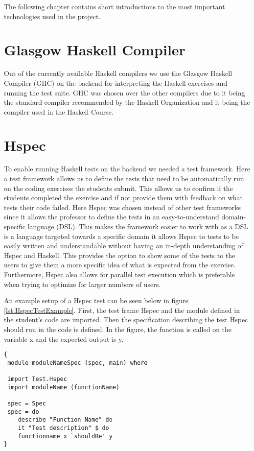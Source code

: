 The following chapter contains short introductions to the most important technologies used in the project. 

\section*{Glasgow Haskell Compiler} %
Out of the currently available Haskell compilers we use the Glasgow Haskell Compiler (GHC) on the backend for interpreting the Haskell exercises and running the test suite. GHC was chosen over the other compilers due to it being the standard compiler recommended by the Haskell Organization \cite{Haskell_GHC} and it being the compiler used in the Haskell Course.

\section*{Hspec}
To enable running Haskell tests on the backend we needed a test framework. Here a test framework allows us to define the tests that need to be automatically run on the coding exercises the students submit. This allows us to confirm if the students completed the exercise and if not provide them with feedback on what tests their code failed.
Here Hspec was chosen instead of other test frameworks since it allows the professor to define the tests in an easy-to-understand domain-specific language (DSL). 
This makes the framework easier to work with as a DSL is a language targeted towards a specific domain it allows Hspec to tests to be easily written and understandable without having an in-depth understanding of Hspec and Haskell. 
This provides the option to show some of the tests to the users to give them a more specific idea of what is expected from the exercise. 
Furthermore, Hspec also allows for parallel test execution which is preferable when trying to optimize for larger numbers of users.

An example setup of a Hspec test can be seen below in figure \ref{lst:HspecTestExample}. First, the test frame Hspec and the module defined in the student’s code are imported. Then the specification describing the test Hspec should run in the code is defined. In the figure, the function is called on the variable x and the expected output is y.

\begin{lstlisting}[language=CSharp, caption={An example of a Hspec Test.}, label={lst:HspecTestExample}]
{
 module moduleNameSpec (spec, main) where

 import Test.Hspec
 import moduleName (functionName)
 
 spec = Spec
 spec = do
 	describe "Function Name" do
 	it "Test description" $ do
	functionname x `shouldBe' y
}
\end{lstlisting}

